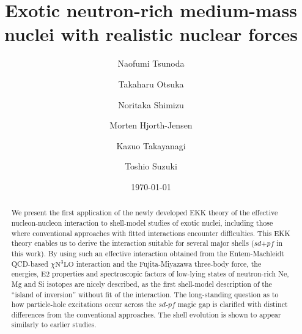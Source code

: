 \documentclass[aps,prl,twocolumn,groupedaddress,showkeys,showpacs,floatfix,superscriptaddress]{revtex4-1}
\newcommand\+{^\dagger}
\newcommand\ntlo{\chi\mathrm{N}^3\mathrm{LO} }
\begin{document}



\title{Exotic neutron-rich medium-mass nuclei with realistic nuclear forces}

\author{Naofumi Tsunoda}
\author{Takaharu Otsuka}
\author{Noritaka Shimizu}
\author{Morten Hjorth-Jensen}
\author{Kazuo Takayanagi}
\author{Toshio Suzuki}

\date{\today}

 \begin{abstract}
  We present the first application of the newly developed EKK theory of the 
  effective nucleon-nucleon interaction to shell-model studies of exotic nuclei, including those 
  where conventional approaches with fitted interactions encounter difficulties.
  This EKK theory enables us to derive the interaction suitable for
  several major shells ($sd$+$pf$ in this work). 
  By using such an effective interaction obtained from the Entem-Machleidt QCD-based $\ntlo$ interaction and 
  the Fujita-Miyazawa three-body force, 
  the energies, E2 properties and spectroscopic factors of low-lying states of 
  neutron-rich Ne, Mg and Si isotopes are nicely described, 
  as the first shell-model description
 of the ``island of inversion'' without fit of the interaction.      
  The long-standing question as to how particle-hole excitations occur across the $sd$-$pf$ 
  magic gap is clarified with distinct differences from the conventional approaches.
  The shell evolution is shown to appear similarly to earlier studies.
\end{abstract}
\end{document}
